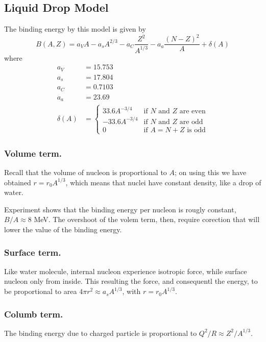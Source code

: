 \documentclass[../../../main.tex]{subfiles}
\begin{document}
\subsection{Liquid Drop Model}
The binding energy by this model is given by 
\begin{equation*}
    B(A,Z)=a_VA- a_sA^{2/3}- a_C\frac{Z^2}{A^{1/3}}-a_a\frac{(N-Z)^2}{A} +\delta(A)
\end{equation*}
where
\begin{align*}
    a_V&= 15.753 \\
    a_s&= 17.804 \\
    a_C&= 0.7103 \\
    a_a&= 23.69 \\
    \delta(A)&= \begin{cases}
        33.6 A^{-3/4}& \text{if $N$ and $Z$ are even}\\
        -33.6 A^{-3/4}& \text{if $N$ and $Z$ are odd}\\
        0 & \text{if $A=N+Z$ is odd}
    \end{cases}
\end{align*}

\subsubsection{Volume term.} Recall that the volume of nucleon is proportional to $A$; on using this we have obtained $r=r_0A^{1/3}$, which means that nuclei have constant density, like a drop of water. 

Experiment shows that the binding energy per nucleon is rougly constant, $B/A\approx 8$ MeV. The overshoot of the volem term, then, require corection that will lower the value of the binding energy.

\subsubsection{Surface term.} Like water molecule, internal nucleon experience isotropic force, while surface nucleon only from inside. This resulting the force, and consequentl the energy, to be proportional to area $4\pi r^2\approx a_sA^{1/3}$, with $r=r_0A^{1/3}$.

\subsubsection{Columb term.} The binding energy due to charged particle is proportional to $Q^2/R\approx Z^2/A^{1/3}$.
\end{document}
